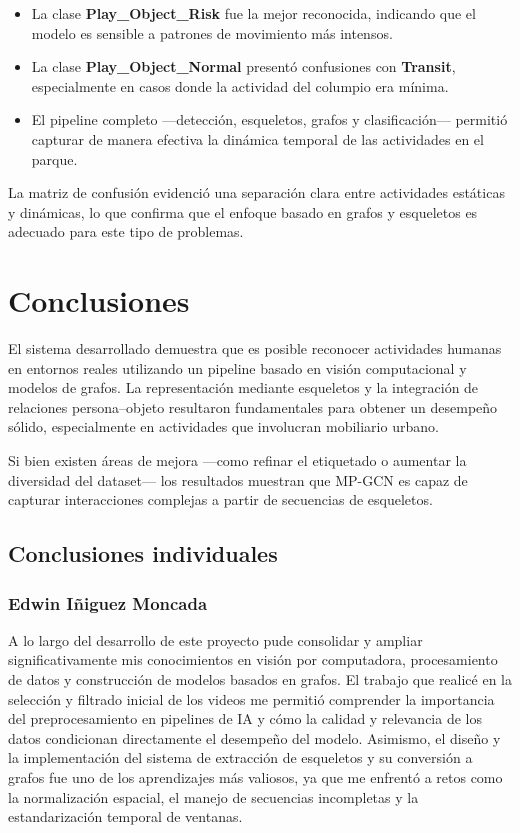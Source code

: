 \documentclass{article}
\begin{document}
\begin{itemize}
    \item La clase \textbf{Play\_Object\_Risk} fue la mejor reconocida, indicando que el modelo es sensible a patrones de movimiento más intensos.
    \item La clase \textbf{Play\_Object\_Normal} presentó confusiones con \textbf{Transit}, especialmente en casos donde la actividad del columpio era mínima.
    \item El pipeline completo —detección, esqueletos, grafos y clasificación— permitió capturar de manera efectiva la dinámica temporal de las actividades en el parque.
\end{itemize}

La matriz de confusión evidenció una separación clara entre actividades estáticas y dinámicas, lo que confirma que el enfoque basado en grafos y esqueletos es adecuado para este tipo de problemas.

\section{Conclusiones}

El sistema desarrollado demuestra que es posible reconocer actividades humanas en entornos reales utilizando un pipeline basado en visión computacional y modelos de grafos. La representación mediante esqueletos y la integración de relaciones persona–objeto resultaron fundamentales para obtener un desempeño sólido, especialmente en actividades que involucran mobiliario urbano.

Si bien existen áreas de mejora —como refinar el etiquetado o aumentar la diversidad del dataset— los resultados muestran que MP-GCN es capaz de capturar interacciones complejas a partir de secuencias de esqueletos.

\subsection{Conclusiones individuales}

\subsubsection*{Edwin Iñiguez Moncada}

A lo largo del desarrollo de este proyecto pude consolidar y ampliar significativamente mis conocimientos en visión por computadora, procesamiento de datos y construcción de modelos basados en grafos. El trabajo que realicé en la selección y filtrado inicial de los videos me permitió comprender la importancia del preprocesamiento en pipelines de IA y cómo la calidad y relevancia de los datos condicionan directamente el desempeño del modelo. Asimismo, el diseño y la implementación del sistema de extracción de esqueletos y su conversión a grafos fue uno de los aprendizajes más valiosos, ya que me enfrentó a retos como la normalización espacial, el manejo de secuencias incompletas y la estandarización temporal de ventanas.
\end{document}
